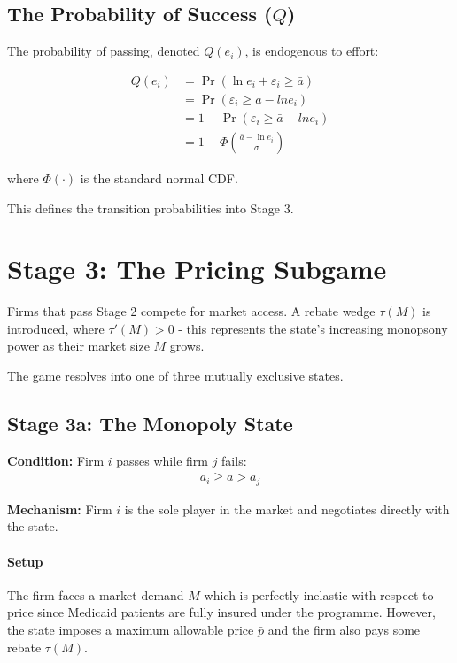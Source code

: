 \documentclass[12pt]{article}
\begin{document}
\subsection{The Probability of Success ($Q$)}
The probability of passing, denoted $Q(e_i)$, is endogenous to effort:

\begin{align}
    Q(e_i) &= \Pr(\ln e_i + \varepsilon_i \geq \bar{a}) \\
           &= \Pr(\varepsilon_i \geq \bar{a} - ln e_i) \\
           &= 1 - \Pr(\varepsilon_i \geq \bar{a} - ln e_i) \\
           &= 1 - \Phi\left(\frac{\bar{a} - \ln e_i}{\sigma}\right)
\end{align}

where $\Phi(\cdot)$ is the standard normal CDF. \vspace{1em}

This defines the transition probabilities into Stage 3.

\newpage

\section{Stage 3: The Pricing Subgame}
Firms that pass Stage 2 compete for market access. A rebate wedge $\tau(M)$ is introduced, where $\tau'(M) > 0$ - this represents the state's increasing monopsony power as their market size $M$ grows.

The game resolves into one of three mutually exclusive states.

\subsection{Stage 3a: The Monopoly State}

\textbf{Condition:} Firm $i$ passes while firm $j$ fails:
\begin{align*}
    a_i \geq \bar{a} > a_j
\end{align*}

\textbf{Mechanism:} Firm $i$ is the sole player in the market and negotiates directly with the state.

\paragraph{Setup} 
The firm faces a market demand $M$ which is perfectly inelastic with respect to price since Medicaid patients are fully insured under the programme. However, the state imposes a maximum allowable price $\bar{p}$ and the firm also pays some rebate $\tau(M)$.
\end{document}
